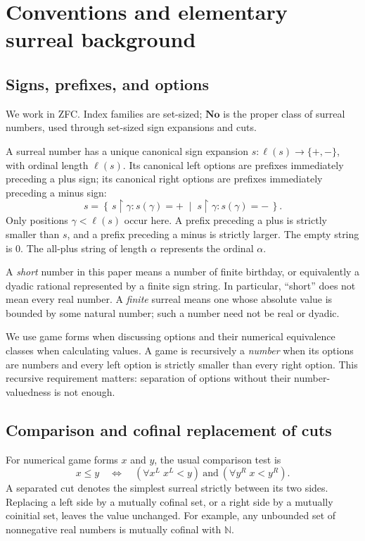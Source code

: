 \documentclass[11pt,letterpaper]{article}
\theoremstyle{definition}
\theoremstyle{remark}
\newcommand{\No}{\mathbf{No}}
\newcommand{\NN}{\mathbb N}
\newcommand{\len}{\ell}
\newcommand{\cut}[2]{\left\{\,#1\;\middle|\;#2\,\right\}}
\newcommand{\pref}[2]{#1\mathbin{\restriction}#2}
\newcommand{\signplus}{\mathtt{+}}
\newcommand{\signminus}{\mathtt{-}}
\begin{document}
\section{Conventions and elementary surreal background}\label{sec:background}

\subsection{Signs, prefixes, and options}

We work in ZFC. Index families are set-sized; $\No$ is the proper class of
surreal numbers, used through set-sized sign expansions and cuts.

A surreal number has a unique canonical sign expansion
$s:\len(s)\longrightarrow\{\signplus,\signminus\}$, with ordinal length
$\len(s)$. Its canonical left options are prefixes immediately preceding a plus
sign; its canonical right options are prefixes immediately preceding a minus
sign:
\begin{equation}\label{eq:signcut}
 s=\cut{\pref{s}{\gamma}:s(\gamma)=\signplus}
        {\pref{s}{\gamma}:s(\gamma)=\signminus}.
\end{equation}
Only positions $\gamma<\len(s)$ occur here. A prefix preceding a plus is strictly
smaller than $s$, and a prefix preceding a minus is strictly larger. The empty
string is $0$. The all-plus string of length $\alpha$ represents the ordinal
$\alpha$.

A \emph{short} number in this paper means a number of finite birthday, or
equivalently a dyadic rational represented by a finite sign string. In
particular, ``short'' does not mean every real number. A \emph{finite} surreal
means one whose absolute value is bounded by some natural number; such a number
need not be real or dyadic.

We use game forms when discussing options and their numerical equivalence
classes when calculating values. A game is recursively a \emph{number} when its
options are numbers and every left option is strictly smaller than every right
option. This recursive requirement matters: separation of options without their
number-valuedness is not enough.

\subsection{Comparison and cofinal replacement of cuts}

For numerical game forms $x$ and $y$, the usual comparison test is
\begin{equation}\label{eq:comparison}
 x\leq y
 \quad\Longleftrightarrow\quad
 (\forall x^L\;x^L<y)\ \text{and}\ (\forall y^R\;x<y^R).
\end{equation}
A separated cut denotes the simplest surreal strictly between its two sides.
Replacing a left side by a mutually cofinal set, or a right side by a mutually
coinitial set, leaves the value unchanged. For example, any unbounded set of
nonnegative real numbers is mutually cofinal with $\NN$.
\end{document}
